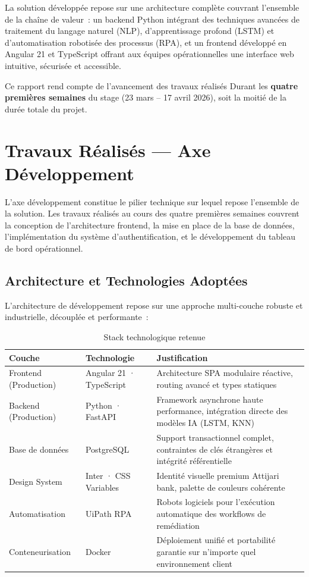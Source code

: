 \documentclass[12pt,a4paper]{report}
\begin{document}
La solution développée repose sur une architecture complète couvrant l'ensemble de la chaîne de valeur~: un backend Python intégrant des techniques avancées de traitement du langage naturel (NLP), d'apprentissage profond (LSTM) et d'automatisation robotisée des processus (RPA), et un frontend développé en Angular 21 et TypeScript offrant aux équipes opérationnelles une interface web intuitive, sécurisée et accessible.

Ce rapport rend compte de l'avancement des travaux réalisés Durant les \textbf{quatre premières semaines} du stage (23 mars -- 17 avril 2026), soit la moitié de la durée totale du projet.

\chapter{Travaux Réalisés --- Axe Développement}

L'axe développement constitue le pilier technique sur lequel repose l'ensemble de la solution. Les travaux réalisés au cours des quatre premières semaines couvrent la conception de l'architecture frontend, la mise en place de la base de données, l'implémentation du système d'authentification, et le développement du tableau de bord opérationnel.

\section{Architecture et Technologies Adoptées}

L'architecture de développement repose sur une approche multi-couche robuste et industrielle, découplée et performante~:

\begin{table}[H]
\centering
\caption{Stack technologique retenue}
\begin{tabularx}{\textwidth}{|l|l|X|}
\hline
\textbf{Couche} & \textbf{Technologie} & \textbf{Justification} \\
\hline
Frontend (Production) & Angular 21 · TypeScript & Architecture SPA modulaire réactive, routing avancé et types statiques \\
\hline
Backend (Production) & Python · FastAPI & Framework asynchrone haute performance, intégration directe des modèles IA (LSTM, KNN) \\
\hline
Base de données & PostgreSQL & Support transactionnel complet, contraintes de clés étrangères et intégrité référentielle \\
\hline
Design System & Inter · CSS Variables & Identité visuelle premium Attijari bank, palette de couleurs cohérente \\
\hline
Automatisation & UiPath RPA & Robots logiciels pour l'exécution automatique des workflows de remédiation \\
\hline
Conteneurisation & Docker & Déploiement unifié et portabilité garantie sur n'importe quel environnement client \\
\hline
\end{tabularx}
\end{table}
\end{document}
